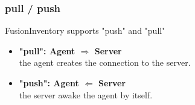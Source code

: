 \documentclass{beamer}
\begin{document}
%
%
%

%

%
%
%
%

\begin{frame}
    \frametitle{pull / push}

    \begin{block}{FusionInventory supports "push" and "pull"}
    \begin{itemize}
    \item \textbf{"pull": Agent $\Longrightarrow$ Server} \\
    the agent creates the connection to the server.
    \item \textbf{"push": Agent $\Longleftarrow$ Server} \\
    the server awake the agent by itself.
    \end{itemize}
    \end{block}

\end{frame}
\end{document}

